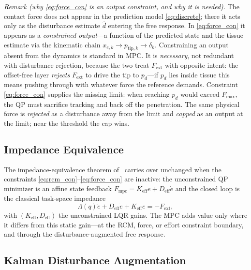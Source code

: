 \emph{Remark (why \eqref{eq:force_con} is an output constraint, and why it is needed).} The contact force does not appear in the prediction model \eqref{eq:discrete}; there it acts only as the disturbance estimate $\hat d$ entering the free response. In \eqref{eq:force_con} it appears as a \emph{constrained output}---a function of the predicted state and the tissue estimate via the kinematic chain $x_{e,k}\to p_{\text{tip},k}\to\delta_k$. Constraining an output absent from the dynamics is standard in MPC. It is \emph{necessary}, not redundant with disturbance rejection, because the two treat $F_{\text{ext}}$ with opposite intent: the offset-free layer \emph{rejects} $F_{\text{ext}}$ to drive the tip to $p_d$---if $p_d$ lies inside tissue this means pushing through with whatever force the reference demands. Constraint \eqref{eq:force_con} supplies the missing limit: when reaching $p_d$ would exceed $F_{\max}$, the QP must sacrifice tracking and back off the penetration. The same physical force is \emph{rejected} as a disturbance away from the limit and \emph{capped} as an output at the limit; near the threshold the cap wins.
\subsection{Impedance Equivalence}

The impedance-equivalence theorem of~\cite{cao2026phri} carries over unchanged when the constraints \eqref{eq:rcm_con}--\eqref{eq:force_con} are inactive: the unconstrained QP minimizer is an affine state feedback $F_{\text{mpc}} = K_{\text{eff}} e + D_{\text{eff}} \dot{e}$ and the closed loop is the classical task-space impedance~\cite{hogan1985}
\begin{equation}
\Lambda(q) \ddot{e} + D_{\text{eff}} \dot{e} + K_{\text{eff}} e = -F_{\text{ext}},
\label{eq:impedance}
\end{equation}
with $(K_{\text{eff}}, D_{\text{eff}})$ the unconstrained LQR gains. The MPC adds value only where it differs from this static gain---at the RCM, force, or effort constraint boundary, and through the disturbance-augmented free response.

\subsection{Kalman Disturbance Augmentation}\label{sec:kalman}

